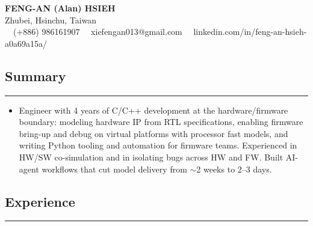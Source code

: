 \documentclass[11pt,a4paper]{article}
\begin{document}
\begin{center}
	{\LARGE \textbf{FENG-AN (Alan) HSIEH}}\\
	Zhubei, Hsinchu, Taiwan
	\vspace{0.05cm}
	\\
	\raisebox{-0.2\height}{\Large \faPhoneSquare} \ \ (+886) 986161907
    \raisebox{-0.2\height}{\Large \faEnvelopeSquare} \ \ xiefengan013@gmail.com
    \raisebox{-0.2\height}{\Large \faLinkedinSquare} \ \ linkedin.com/in/feng-an-hsieh-a0a69a15a/
\end{center}

\subsection*{\large Summary}
\hrule
\vspace{0.3em}

\begin{itemize}[leftmargin=1em,noitemsep]
	\item[]
    Engineer with 4 years of C/C++ development at the hardware/firmware boundary: modeling hardware IP from RTL specifications, enabling firmware bring-up and debug on virtual platforms with processor fast models, and writing Python tooling and automation for firmware teams. Experienced in HW/SW co-simulation and in isolating bugs across HW and FW. Built AI-agent workflows that cut model delivery from $\sim$2 weeks to 2--3 days.
\end{itemize}

\subsection*{\large Experience}
\hrule
\vspace{0.3em}
\end{document}
